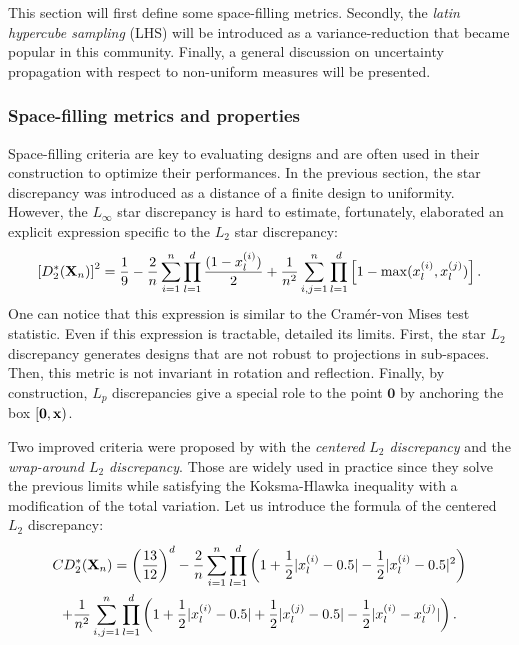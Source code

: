 This section will first define some space-filling metrics.
Secondly, the \textit{latin hypercube sampling} (LHS) will be introduced as a variance-reduction that became popular in this community. 
Finally, a general discussion on uncertainty propagation with respect to non-uniform measures will be presented.

\subsubsection{Space-filling metrics and properties}
Space-filling criteria are key to evaluating designs and are often used in their construction to optimize their performances. 
In the previous section, the star discrepancy was introduced as a distance of a finite design to uniformity.
However, the $L_\infty$ star discrepancy is hard to estimate, fortunately, \citet{warnock_1972} elaborated an explicit expression specific to the $L_2$ star discrepancy: 
\begin{equation}
    \left[D^*_2({\bf X}_n)\right]^2 = \frac19 - \frac2n \sum_{i=1}^{n} \prod_{l=1}^{d} \frac{(1-x_l^{(i)})}{2} + \frac{1}{n^2}\sum_{i,j=1}^{n} \prod_{l=1}^{d} \left[1 - \max(x_l^{(i)}, x_l^{(j)})\right].
\end{equation}
One can notice that this expression is similar to the Cramér-von Mises test statistic. 
Even if this expression is tractable, \citet{fang_liu_2018} detailed its limits. 
First, the star $L_2$ discrepancy generates designs that are not robust to projections in sub-spaces. 
Then, this metric is not invariant in rotation and reflection. 
Finally, by construction, $L_p$ discrepancies give a special role to the point $\mathbf{0}$ by anchoring the box $[\mathbf{0}, {\bf x})$.

Two improved criteria were proposed by \citet{hickernell_1998} with the \textit{centered $L_2$ discrepancy} and the \textit{wrap-around $L_2$ discrepancy}.
Those are widely used in practice since they solve the previous limits while satisfying the Koksma-Hlawka inequality with a modification of the total variation.
Let us introduce the formula of the centered $L_2$ discrepancy:
\begin{multline} CD^*_2({\bf X}_n)  = \left(\frac{13}{12}\right)^{d} - \frac{2}{n} \sum_{i=1}^{n} \prod_{l=1}^{d} \left( 1 + \frac{1}{2} |x_l^{(i)} - 0.5| - \frac{1}{2} |x_l^{(i)} - 0.5|^2 \right)\\
    + \frac{1}{n^2} \sum_{i,j=1}^{n} \prod_{l=1}^{d} \left( 1 + \frac{1}{2} |x_l^{(i)} - 0.5| + \frac{1}{2} |x_l^{(j)} - 0.5| - \frac{1}{2} |x_l^{(i)} - x_l^{(j)}| \right).
\end{multline}

